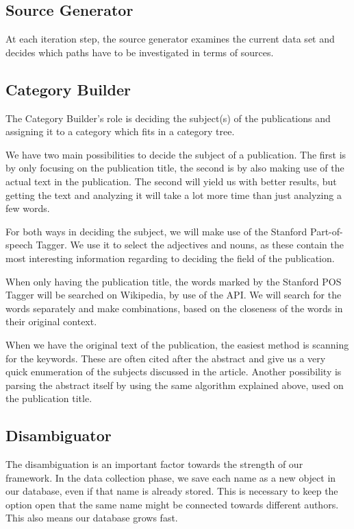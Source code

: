\subsection{Source Generator}

At each iteration step, the source generator examines the current data set and decides which paths have to be investigated in terms of sources.

\subsection{Category Builder}
\label{categorybuilder}

The Category Builder's role is deciding the subject(s) of the publications and assigning it to a category which fits in a category tree.

We have two main possibilities to decide the subject of a publication. The first is by only focusing on the publication title, the second is by also making use of the actual text in the publication. The second will yield us with better results, but getting the text and analyzing it will take a lot more time than just analyzing a few words. 

For both ways in deciding the subject, we will make use of the Stanford Part-of-speech Tagger. We use it to select the adjectives and nouns, as these contain the most interesting information regarding to deciding the field of the publication.

When only having the publication title, the words marked by the Stanford POS Tagger will be searched on Wikipedia, by use of the API. We will search for the words separately and make combinations, based on the closeness of the words in their original context.

When we have the original text of the publication, the easiest method is scanning for the keywords. These are often cited after the abstract and give us a very quick enumeration of the subjects discussed in the article. Another possibility is parsing the abstract itself by using the same algorithm explained above, used on the publication title.


\subsection{Disambiguator}
\label{disambiguator}

The disambiguation is an important factor towards the strength of our framework. In the data collection phase, we save each name as a new object in our database, even if that name is already stored. This is necessary to keep the option open that the same name might be connected towards different authors. This also means our database grows fast. 

